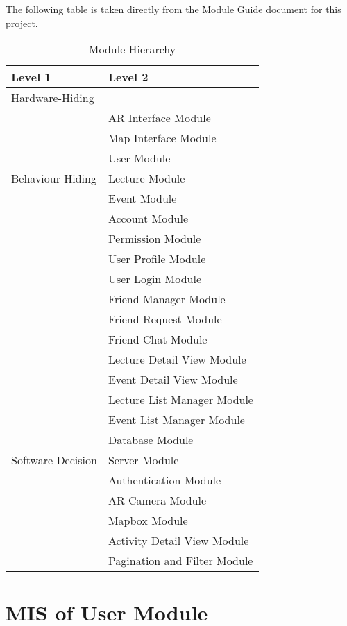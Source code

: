 \documentclass[12pt, titlepage]{article}
\begin{document}
The following table is taken directly from the Module Guide document for this project.

\begin{table}[h!]
\centering
\begin{tabular}{p{} p{}}
\toprule
\textbf{Level 1} & \textbf{Level 2}\\
\midrule

{Hardware-Hiding} & ~ \\
\midrule

\multirow{7}{0.3\textwidth}{Behaviour-Hiding}
& AR Interface Module\\
& Map Interface Module\\
& User Module\\
& Lecture Module\\
& Event Module\\
& Account Module\\
& Permission Module\\
& User Profile Module\\
& User Login Module\\
& Friend Manager Module\\ 
& Friend Request Module\\
& Friend Chat Module\\
& Lecture Detail View Module\\
& Event Detail View Module\\
& Lecture List Manager Module\\
& Event List Manager Module\\
\midrule

\multirow{3}{0.3\textwidth}{Software Decision}
& Database Module\\
& Server Module\\
& Authentication Module\\
& AR Camera Module\\
& Mapbox Module\\
& Activity Detail View Module\\
& Pagination and Filter Module\\
\bottomrule

\end{tabular}
\caption{Module Hierarchy}
\label{TblMH}
\end{table}

\newpage

\section{MIS of User Module} \label{mUser}
\end{document}
